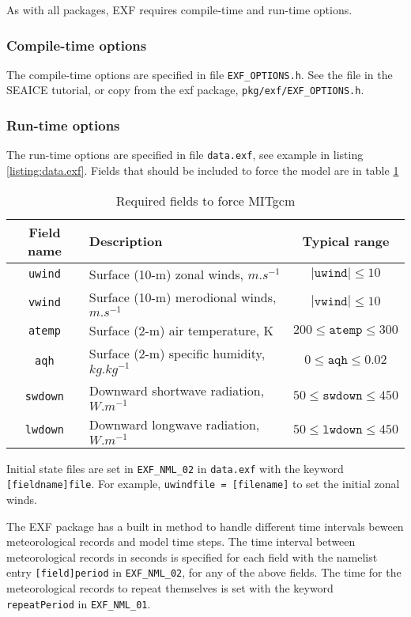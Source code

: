 \documentclass[11pt]{article}
\begin{document}
As with all packages, EXF requires compile-time and run-time options.

\subsubsection*{Compile-time options}
The compile-time options are specified in file \verb|EXF_OPTIONS.h|. See the file in the SEAICE tutorial, or copy from the exf package, \verb|pkg/exf/EXF_OPTIONS.h|.

\subsubsection*{Run-time options}
The run-time options are specified in file \verb|data.exf|, see example in listing \ref{listing:data.exf}. Fields that should be included to force the model are in table \ref{table:EXFfields}

\begin{table}
\begin{tabularx}{\textwidth}{ c X c }
\hline
Field name &  Description & Typical range \\ \hline \hline
\texttt{uwind}& Surface (10-m) zonal winds, $\si{m.s^{-1}}$ & $\left| \texttt{uwind} \right| \leq 10$ \\
\texttt{vwind} & Surface (10-m) merodional winds, $\si{m.s^{-1}}$ & $\left| \texttt{vwind} \right| \leq 10$ \\
\texttt{atemp} & Surface (2-m) air temperature, $\si{\kelvin}$ & $200 \leq \texttt{atemp} \leq 300$ \\
\texttt{aqh} & Surface (2-m) specific humidity, $\si{kg.kg^{-1}}$ & $0 \leq \texttt{aqh} \leq 0.02$ \\
\texttt{swdown} & Downward shortwave radiation, $\si{W.m^{-1}}$ & $50 \leq \texttt{swdown} \leq450$ \\
\texttt{lwdown} & Downward longwave radiation, $\si{W.m^{-1}}$ & $50 \leq \texttt{lwdown} \leq450$ \\

\hline
\end{tabularx}
\caption{Required fields to force MITgcm}
\label{table:EXFfields}
\end{table}

Initial state files are set in \verb|EXF_NML_02| in \verb|data.exf| with the keyword \verb|[fieldname]file|. For example, \verb|uwindfile = [filename]| to set the initial zonal winds.

The EXF package has a built in method to handle different time intervals beween meteorological records and model time steps. The time interval between meteorological records in seconds is specified for each field with the namelist entry \verb|[field]period| in \verb|EXF_NML_02|, for any of the above fields. The time for the meteorological records to repeat themselves is set with the keyword \verb|repeatPeriod| in \verb|EXF_NML_01|.
\end{document}
